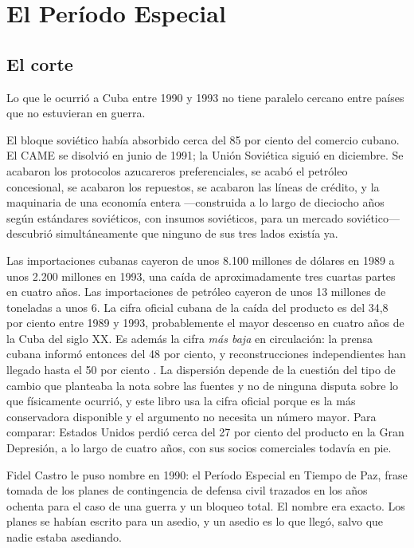 \chapter{El Período Especial}
\label{ch:collapse}

\section{El corte}

Lo que le ocurrió a Cuba entre 1990 y 1993 no tiene paralelo cercano entre países
que no estuvieran en guerra.

El bloque soviético había absorbido cerca del 85 por ciento del comercio cubano.
El CAME se disolvió en junio de 1991; la Unión Soviética siguió en diciembre. Se
acabaron los protocolos azucareros preferenciales, se acabó el petróleo
concesional, se acabaron los repuestos, se acabaron las líneas de crédito, y la
maquinaria de una economía entera ---construida a lo largo de dieciocho años según
estándares soviéticos, con insumos soviéticos, para un mercado soviético---
descubrió simultáneamente que ninguno de sus tres lados existía ya.

Las importaciones cubanas cayeron de unos 8.100 millones de dólares en 1989 a
unos 2.200 millones en 1993, una caída de aproximadamente tres cuartas partes en
cuatro años.\unv{} Las importaciones de petróleo cayeron de unos 13 millones de
toneladas a unos 6.\unv{} La cifra oficial cubana de la caída del producto es del
34,8 por ciento entre 1989 y 1993, probablemente el mayor descenso en cuatro años
de la Cuba del siglo XX. Es además la cifra \emph{más baja} en circulación: la
prensa cubana informó entonces del 48 por ciento, y reconstrucciones
independientes han llegado hasta el 50 por ciento \citep{mesalago2005}. La
dispersión depende de la cuestión del tipo de cambio que planteaba la nota sobre
las fuentes y no de ninguna disputa sobre lo que físicamente ocurrió, y este
libro usa la cifra oficial porque es la más conservadora disponible y el
argumento no necesita un número mayor. Para comparar: Estados Unidos perdió cerca
del 27 por ciento del producto en la Gran Depresión, a lo largo de cuatro años,
con sus socios comerciales todavía en pie.

Fidel Castro le puso nombre en 1990: el Período Especial en Tiempo de Paz, frase
tomada de los planes de contingencia de defensa civil trazados en los años ochenta
para el caso de una guerra y un bloqueo total. El nombre era exacto. Los planes se
habían escrito para un asedio, y un asedio es lo que llegó, salvo que nadie estaba
asediando.

